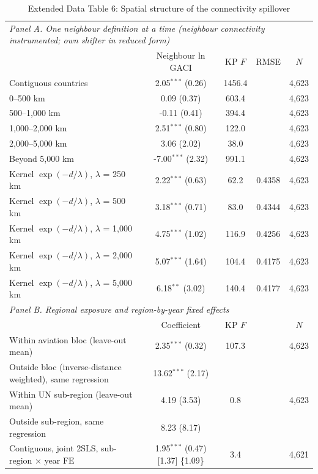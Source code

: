 \documentclass[12pt]{article}
\begin{document}
\begin{table}[htbp]
\centering
\begin{threeparttable}
\caption{Extended Data Table 6: Spatial structure of the connectivity spillover}
\label{tab:spill_ext}
\scriptsize
\begin{tabular}{lcccc}
\toprule
\multicolumn{5}{l}{\textit{Panel A. One neighbour definition at a time (neighbour connectivity instrumented; own shifter in reduced form)}} \\
 & Neighbour ln GACI & KP $F$ & RMSE & $N$ \\
\midrule
  Contiguous countries & 2.05$^{***}$ (0.26) & 1456.4 & & 4,623 \\
  0--500 km & 0.09 (0.37) & 603.4 & & 4,623 \\
  500--1,000 km & -0.11 (0.41) & 394.4 & & 4,623 \\
  1,000--2,000 km & 2.51$^{***}$ (0.80) & 122.0 & & 4,623 \\
  2,000--5,000 km & 3.06 (2.02) & 38.0 & & 4,623 \\
  Beyond 5,000 km & -7.00$^{***}$ (2.32) & 991.1 & & 4,623 \\
  Kernel $\exp(-d/\lambda)$, $\lambda$ = 250 km & 2.22$^{***}$ (0.63) & 62.2 & 0.4358 & 4,623 \\
  Kernel $\exp(-d/\lambda)$, $\lambda$ = 500 km & 3.18$^{***}$ (0.71) & 83.0 & 0.4344 & 4,623 \\
  Kernel $\exp(-d/\lambda)$, $\lambda$ = 1,000 km & 4.75$^{***}$ (1.02) & 116.9 & 0.4256 & 4,623 \\
  Kernel $\exp(-d/\lambda)$, $\lambda$ = 2,000 km & 5.07$^{***}$ (1.64) & 104.4 & 0.4175 & 4,623 \\
  Kernel $\exp(-d/\lambda)$, $\lambda$ = 5,000 km & 6.18$^{**}$ (3.02) & 140.4 & 0.4177 & 4,623 \\
\midrule
\multicolumn{5}{l}{\textit{Panel B. Regional exposure and region-by-year fixed effects}} \\
 & Coefficient & KP $F$ & & $N$ \\
  Within aviation bloc (leave-out mean) & 2.35$^{***}$ (0.32) & 107.3 & & 4,623 \\
  Outside bloc (inverse-distance weighted), same regression & 13.62$^{***}$ (2.17) & & & \\
  Within UN sub-region (leave-out mean) & 4.19 (3.53) & 0.8 & & 4,623 \\
  Outside sub-region, same regression & 8.23 (8.17) & & & \\
  Contiguous, joint 2SLS, sub-region $\times$ year FE & 1.95$^{***}$ (0.47) [1.37] \{1.09\} & 3.4 & & 4,621 \\

\end{tabular}
\end{threeparttable}
\end{table}
\end{document}
